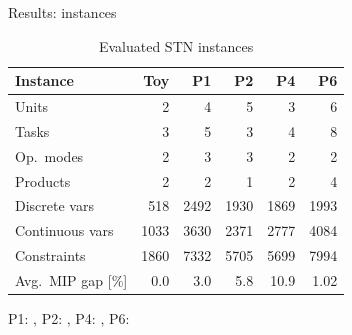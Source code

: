 \documentclass[aspectratio=169,slides]{beamer}
\begin{document}
\begin{frame}{Results: instances}
    \begin{table}[htb]
        \centering
        \begin{tabular}{l r r r r r}
            \hline
            Instance            & Toy  & P1 & P2   & P4   & P6   \\ \hline
            Units               & 2    & 4    & 5    & 3    & 6    \\
            Tasks               & 3    & 5    & 3    & 4    & 8    \\
            Op.~modes           & 2    & 3    & 3    & 2    & 2    \\
            Products            & 2    & 2    & 1    & 2    & 4    \\ \hline
            Discrete vars       & 518  & 2492 & 1930 & 1869 & 1993 \\
            Continuous vars     & 1033 & 3630 & 2371 & 2777 & 4084 \\
            Constraints         & 1860 & 7332 & 5705 & 5699 & 7994 \\
            Avg.~MIP gap [\%]   & 0.0  & 3.0  & 5.8  & 10.9 & 1.02 \\
            \hline
        \end{tabular}
        \caption{Evaluated STN instances}
        \label{tab:instances}
    \end{table}
    \scriptsize
    P1: \citet{Kondili1993}, P2: \citet{Karimi1997}, P4: \citet{Maravelias2003},
    P6: \citet{Ierapetritou1998}

\end{frame}
\end{document}
